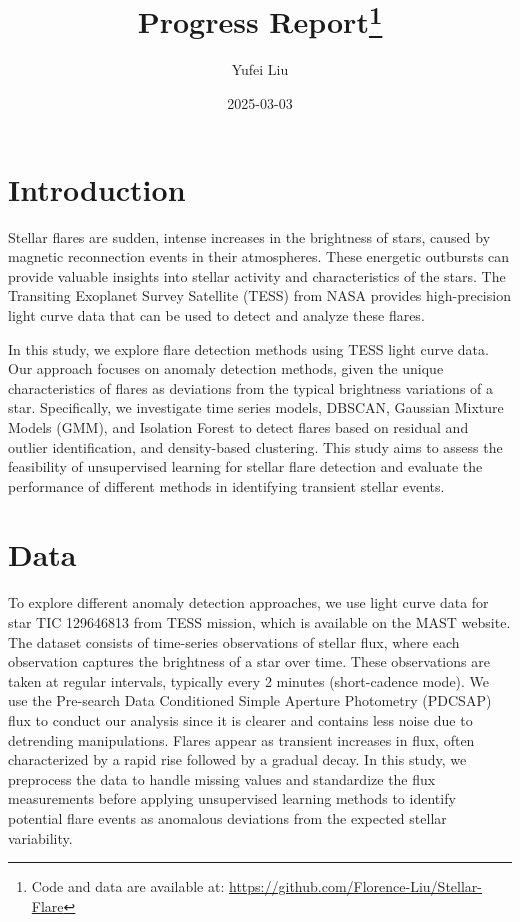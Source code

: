 \documentclass[
]{article}
\title{Progress Report\thanks{Code and data are available at: \url{https://github.com/Florence-Liu/Stellar-Flare}}}
\author{Yufei Liu}
\date{2025-03-03}
\begin{document}
\maketitle

\section{Introduction}\label{introduction}

Stellar flares are sudden, intense increases in the brightness of stars, caused by magnetic reconnection events in their atmospheres. These energetic outbursts can provide valuable insights into stellar activity and characteristics of the stars. The Transiting Exoplanet Survey Satellite (TESS) from NASA provides high-precision light curve data that can be used to detect and analyze these flares.

In this study, we explore flare detection methods using TESS light curve data. Our approach focuses on anomaly detection methods, given the unique characteristics of flares as deviations from the typical brightness variations of a star. Specifically, we investigate time series models, DBSCAN, Gaussian Mixture Models (GMM), and Isolation Forest to detect flares based on residual and outlier identification, and density-based clustering. This study aims to assess the feasibility of unsupervised learning for stellar flare detection and evaluate the performance of different methods in identifying transient stellar events.

\section{Data}\label{data}

To explore different anomaly detection approaches, we use light curve data for star TIC 129646813 from TESS mission, which is available on the MAST website. The dataset consists of time-series observations of stellar flux, where each observation captures the brightness of a star over time. These observations are taken at regular intervals, typically every 2 minutes (short-cadence mode). We use the Pre-search Data Conditioned Simple Aperture Photometry (PDCSAP) flux to conduct our analysis since it is clearer and contains less noise due to detrending manipulations. Flares appear as transient increases in flux, often characterized by a rapid rise followed by a gradual decay. In this study, we preprocess the data to handle missing values and standardize the flux measurements before applying unsupervised learning methods to identify potential flare events as anomalous deviations from the expected stellar variability.
\end{document}
